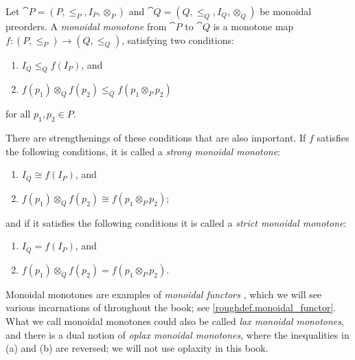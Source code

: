 \documentclass[7Sketches]{subfiles}
\begin{document}
\begin{definition}%
\label{def.monoidal_functor}
Let $\cat{P}=(P,\leq_P, I_P, \otimes_P)$ and $\cat{Q}=(Q,\leq_Q, I_Q,\otimes_Q)$
be monoidal preorders. A \emph{monoidal monotone} from $\cat{P}$ to $\cat{Q}$ is a
monotone map $f\colon(P,\leq_P)\to (Q,\leq_Q)$, satisfying two conditions:
\begin{enumerate}[label=(\alph*)]
	\item $I_Q\leq_Q f(I_P)$, and
	\item $f(p_1)\otimes_Qf(p_2)\leq_Q f(p_1\otimes_Pp_2)$
\end{enumerate}
for all $p_1,p_2\in P$.

There are strengthenings of these conditions that are also important. If $f$
satisfies the following conditions, it is called a \emph{strong monoidal
monotone}:
\begin{enumerate}[label=(\alph*')]
	\item $I_Q\cong f(I_P)$, and
	\item $f(p_1)\otimes_Qf(p_2)\cong f(p_1\otimes_Pp_2)$;
\end{enumerate}
and if it satisfies the following conditions it is called a \emph{strict
monoidal monotone}:
\begin{enumerate}[label=(\alph*'')]
	\item $I_Q= f(I_P)$, and
	\item $f(p_1)\otimes_Qf(p_2)= f(p_1\otimes_Pp_2)$.
\end{enumerate}
\end{definition}

Monoidal monotones are examples of \emph{monoidal functors}%
, which we will see various incarnations of throughout the book; see \cref{roughdef.monoidal_functor}. What we call monoidal monotones could also be called \emph{lax monoidal monotones}, and there is a dual notion of \emph{oplax monoidal monotones}, where the inequalities in (a) and (b) are reversed; we will not use oplaxity in this book.%

\label{def.equiv_iso_mon_preorders}
%
\end{document}
